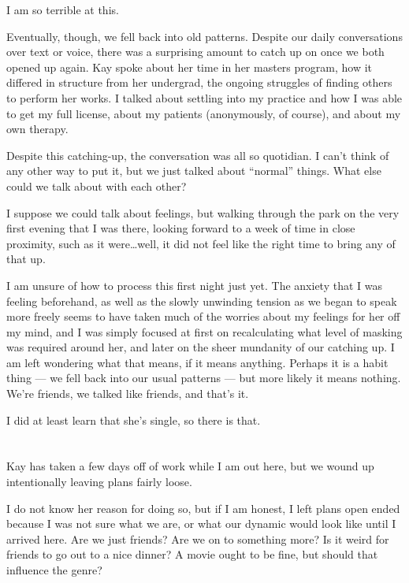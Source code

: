 I am so terrible at this.

Eventually, though, we fell back into old patterns. Despite our daily conversations over text or voice, there was a surprising amount to catch up on once we both opened up again. Kay spoke about her time in her masters program, how it differed in structure from her undergrad, the ongoing struggles of finding others to perform her works. I talked about settling into my practice and how I was able to get my full license, about my patients (anonymously, of course), and about my own therapy.

Despite this catching-up, the conversation was all so quotidian. I can't think of any other way to put it, but we just talked about ``normal'' things. What else could we talk about with each other?

I suppose we could talk about feelings, but walking through the park on the very first evening that I was there, looking forward to a week of time in close proximity, such as it were\ldots well, it did not feel like the right time to bring any of that up.

I am unsure of how to process this first night just yet. The anxiety that I was feeling beforehand, as well as the slowly unwinding tension as we began to speak more freely seems to have taken much of the worries about my feelings for her off my mind, and I was simply focused at first on recalculating what level of masking was required around her, and later on the sheer mundanity of our catching up. I am left wondering what that means, if it means anything. Perhaps it is a habit thing --- we fell back into our usual patterns --- but more likely it means nothing. We're friends, we talked like friends, and that's it.

I did at least learn that she's single, so there is that.

\section{}

Kay has taken a few days off of work while I am out here, but we wound up intentionally leaving plans fairly loose.

I do not know her reason for doing so, but if I am honest, I left plans open ended because I was not sure what we are, or what our dynamic would look like until I arrived here. Are we just friends? Are we on to something more? Is it weird for friends to go out to a nice dinner? A movie ought to be fine, but should that influence the genre?

